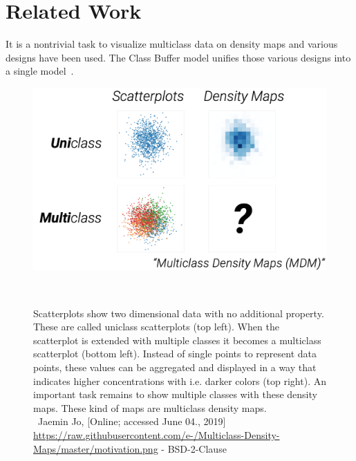 \section{Related Work}

It is a nontrivial task to visualize multiclass data on density maps and various designs have been used. The Class Buffer model unifies those various designs into a single model~\cite{jo2019declarative}.

\begin{figure}
	\centering
	\includegraphics[width=\columnwidth]{./figures/motivation}
	\caption[motivation]{Scatterplots show two dimensional data with no additional property. These are called uniclass scatterplots (top left). When the scatterplot is extended with multiple classes it becomes a multiclass scatterplot (bottom left). Instead of single points to represent data points, these values can be aggregated and displayed in a way that indicates higher concentrations with i.e. darker colors (top right). An important task remains to show multiple classes with these density maps. These kind of maps are multiclass density maps.\\\textcopyright~Jaemin Jo, [Online; accessed June 04., 2019] \url{https://raw.githubusercontent.com/e-/Multiclass-Density-Maps/master/motivation.png} - BSD-2-Clause}~\label{fig:motivation}
\end{figure}

